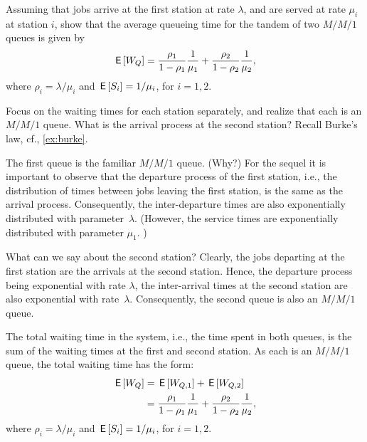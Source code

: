 \begin{exercise}
Assuming that jobs arrive at the first station at rate $\lambda$, and are served at rate $\mu_i$ at station $i$, show that the average queueing time for the tandem of two $M/M/1$ queues is given by
\begin{equation}
\,\mathsf{E}\left[W_Q\right]  = \frac{\rho_1}{1-\rho_1} \frac1{\mu_1} + \frac{\rho_2}{1-\rho_2} \frac1{\mu_2},
\end{equation}
where $\rho_i = \lambda/\mu_i$ and $\,\mathsf{E}\left[S_i\right] = 1/\mu_i$, for $i=1,2$. 
\begin{hint}
Focus on the waiting times for each station separately, and realize that each is an $M/M/1$ queue. What is the arrival process at the second station? Recall Burke's law, cf., \ref{ex:burke}.
\end{hint}
\begin{solution}
The first queue is the familiar $M/M/1$ queue.  (Why?) For the sequel
it is important to observe that the departure process of the first
station, i.e., the distribution of times between jobs leaving the
first station, is the same as the arrival process. Consequently, the
inter-departure times are also exponentially distributed with parameter~$\lambda$. (However, the service times are exponentially distributed
with parameter $\mu_1$. ) 

What can we say about the second station?  Clearly, the jobs departing
at the first station are the arrivals at the second station. Hence,
the departure process being exponential with rate $\lambda$, the
inter-arrival times at the second station are also exponential with
rate~$\lambda$. Consequently, the second queue is also an $M/M/1$
queue.

The total waiting time in the
system, i.e., the time spent in both queues, is the sum of the waiting
times at the first and second station. As each is an $M/M/1$ queue,
the total waiting time has the form:
\begin{equation}
  \begin{split}
\,\mathsf{E}\left[W_Q\right]  &= \,\mathsf{E}\left[W_{Q,1}\right] + \,\mathsf{E}\left[W_{Q,2}\right] \\
&= \frac{\rho_1}{1-\rho_1} \frac1{\mu_1} + \frac{\rho_2}{1-\rho_2} \frac1{\mu_2},
  \end{split}
\end{equation}
where $\rho_i = \lambda/\mu_i$ and $\,\mathsf{E}\left[S_i\right] = 1/\mu_i$, for $i=1,2$. 
\end{solution}
\end{exercise}


